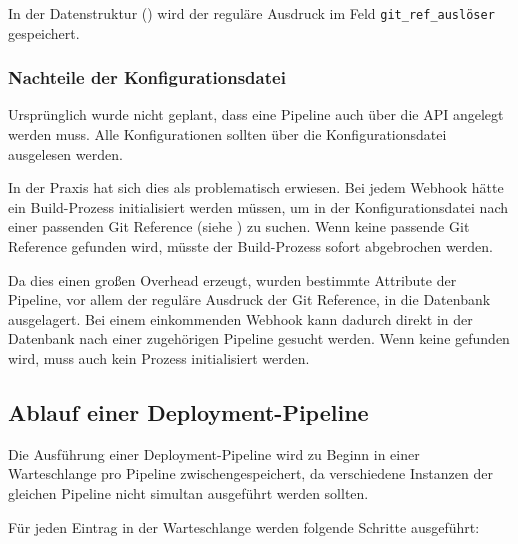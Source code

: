 In der Datenstruktur () wird der reguläre Ausdruck im Feld \texttt{git\_\allowbreak ref\_\allowbreak auslöser} gespeichert.

\subsubsection{Nachteile der Konfigurationsdatei}

Ursprünglich wurde nicht geplant, dass eine Pipeline auch über die API angelegt werden muss. Alle Konfigurationen sollten über die Konfigurationsdatei ausgelesen werden.

In der Praxis hat sich dies als problematisch erwiesen. Bei jedem Webhook hätte ein Build-Prozess initialisiert werden müssen, um in der Konfigurationsdatei nach einer passenden Git Reference (siehe ) zu suchen. Wenn keine passende Git Reference gefunden wird, müsste der Build-Prozess sofort abgebrochen werden.

Da dies einen großen Overhead erzeugt, wurden bestimmte Attribute der Pipeline, vor allem der reguläre Ausdruck der Git Reference, in die Datenbank ausgelagert. Bei einem einkommenden Webhook kann dadurch direkt in der Datenbank nach einer zugehörigen Pipeline gesucht werden. Wenn keine gefunden wird, muss auch kein Prozess initialisiert werden.

\subsection{Ablauf einer Deployment-Pipeline}
\label{subsec:ablauf-build}

Die Ausführung einer Deployment-Pipeline wird zu Beginn in einer Warteschlange pro Pipeline zwischengespeichert, da verschiedene Instanzen der gleichen Pipeline nicht simultan ausgeführt werden sollten.

Für jeden Eintrag in der Warteschlange werden folgende Schritte ausgeführt:

